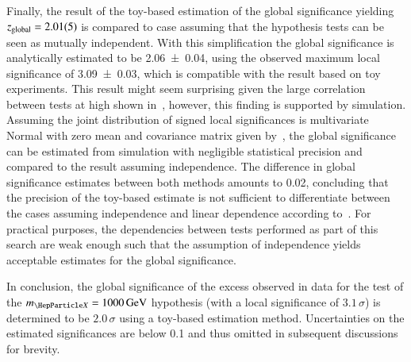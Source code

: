 Finally, the result of the toy-based estimation of the global
significance yielding $z_{\text{global}} = \num{2.01 +- 0.05}$ is
compared to case assuming that the hypothesis tests can be seen as
mutually independent. With this simplification the global significance
is analytically estimated to be \num{2.06 +- 0.04}, using the observed
maximum local significance of \num{3.09 +- 0.03}, which is compatible
with the result based on toy experiments. This result might seem
surprising given the large correlation between tests at high \mX shown
in~, however, this finding is supported by
simulation. Assuming the joint distribution of signed local
significances is multivariate Normal with zero mean and covariance
matrix given by~, the global significance can be
estimated from simulation with negligible statistical precision and
compared to the result assuming independence. The difference in global
significance estimates between both methods amounts to \num{0.02},
concluding that the precision of the toy-based estimate is not
sufficient to differentiate between the cases assuming independence
and linear dependence according to~. For practical
purposes, the dependencies between tests performed as part of this
search are weak enough such that the assumption of independence yields
acceptable estimates for the global significance.

In conclusion, the global significance of the excess observed in data
for the test of the $\mX = \SI{1000}{\GeV}$ hypothesis (with a local
significance of $3.1\,\sigma$) is determined to be $2.0\,\sigma$ using
a toy-based estimation method. Uncertainties on the estimated
significances are below \num{0.1} and thus omitted in subsequent
discussions for brevity.


